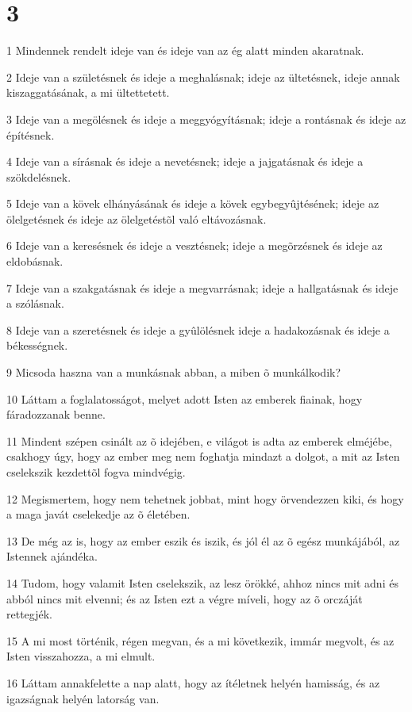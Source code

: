 \chapter{3}

\par 1 Mindennek rendelt ideje van és ideje van az ég alatt minden akaratnak.
\par 2 Ideje van a születésnek és ideje a meghalásnak; ideje az ültetésnek, ideje annak kiszaggatásának, a mi ültettetett.
\par 3 Ideje van a megölésnek és ideje a meggyógyításnak; ideje a rontásnak és ideje az építésnek.
\par 4 Ideje van a sírásnak és ideje a nevetésnek; ideje a jajgatásnak és ideje a szökdelésnek.
\par 5 Ideje van a kövek elhányásának és ideje a kövek egybegyûjtésének; ideje az ölelgetésnek és ideje az ölelgetéstõl való eltávozásnak.
\par 6 Ideje van a keresésnek és ideje a vesztésnek; ideje a megõrzésnek és ideje az eldobásnak.
\par 7 Ideje van a szakgatásnak és ideje a megvarrásnak; ideje a hallgatásnak és ideje a szólásnak.
\par 8 Ideje van a szeretésnek és ideje a gyûlölésnek ideje a hadakozásnak és ideje a békességnek.
\par 9 Micsoda haszna van a munkásnak abban, a miben õ munkálkodik?
\par 10 Láttam a foglalatosságot, melyet adott Isten az emberek fiainak, hogy fáradozzanak benne.
\par 11 Mindent szépen csinált az õ idejében, e világot is adta az emberek elméjébe, csakhogy úgy, hogy az ember meg nem foghatja mindazt a dolgot, a mit az Isten cselekszik kezdettõl fogva mindvégig.
\par 12 Megismertem, hogy nem tehetnek jobbat, mint hogy örvendezzen kiki, és hogy a maga javát cselekedje  az õ életében.
\par 13 De még az is, hogy az ember eszik és iszik, és jól él az õ egész munkájából, az Istennek ajándéka.
\par 14 Tudom, hogy valamit Isten cselekszik, az lesz örökké, ahhoz nincs mit adni és abból nincs mit elvenni; és az Isten ezt a végre míveli, hogy az õ orczáját rettegjék.
\par 15 A mi most történik, régen megvan, és a mi következik, immár megvolt, és az Isten visszahozza, a mi elmult.
\par 16 Láttam annakfelette a nap alatt, hogy az ítéletnek helyén hamisság, és az igazságnak helyén latorság van.
